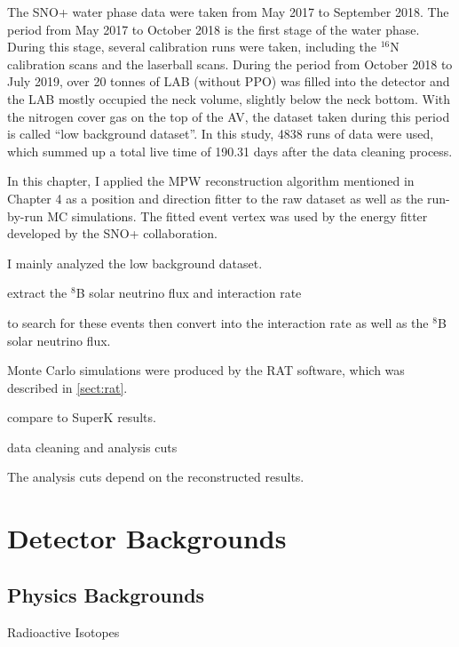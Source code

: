 
The SNO+ water phase data were taken from May 2017 to September 2018. The period from May 2017 to October 2018 is the first stage of the water phase. During this stage, several calibration runs were taken, including the $^{16}$N calibration scans and the laserball scans. During the period from October 2018 to July 2019, over 20 tonnes of LAB (without PPO) was filled into the detector and the LAB mostly occupied the neck volume, slightly below the neck bottom. With the nitrogen cover gas on the top of the AV, the dataset taken during this period is called ``low background dataset''. In this study, 4838 runs of data were used, which summed up a total live time of 190.31 days after the data cleaning process.
 
In this chapter, I applied the MPW reconstruction algorithm mentioned in Chapter 4 as a position and direction fitter to the raw dataset as well as the run-by-run MC simulations. The fitted event vertex was used by the energy fitter developed by the SNO+ collaboration.  

I mainly analyzed the low background dataset. 

extract the $^8$B solar neutrino flux and interaction rate


to search for these events
then convert into the interaction rate as well as the $^8$B solar neutrino flux.




Monte Carlo simulations were produced by the RAT software, which was described in \ref{sect:rat}.

compare to SuperK results.


data cleaning and analysis cuts 

The analysis cuts depend on the reconstructed results.


\section{Detector Backgrounds}

\subsection{Physics Backgrounds}

Radioactive Isotopes


